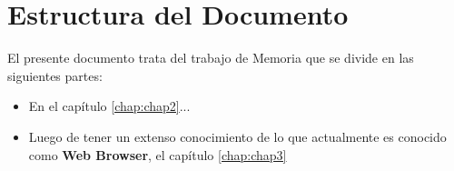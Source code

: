 \section{Estructura del Documento}
\label{chap1:estruct}

El presente documento trata del trabajo de Memoria que se divide en las siguientes partes:

\begin{itemize}
	\item En el capítulo \ref{chap:chap2}... %
	\item Luego de tener un extenso conocimiento de lo que actualmente es conocido como \textbf{Web Browser}, el capítulo \ref{chap:chap3}
\end{itemize}












